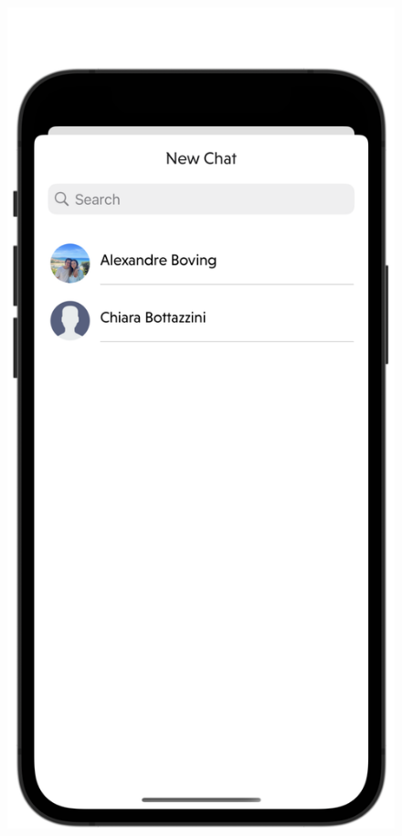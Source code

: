 \begin{figure}[H]
    \centering
    \begin{minipage}[b]{0.43\linewidth}
        \centering
        \includegraphics[width=\linewidth]{Images/New Chat Selection.png}

\end{minipage}
\end{figure}
